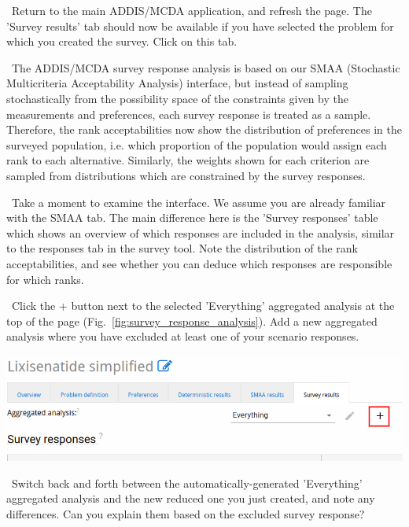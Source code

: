 \documentclass[00_mcda_tutorial.tex]{subfiles}
\begin{document}
\begin{sidebar*}
\noindent \leftpointright \, Return to the main ADDIS/MCDA application, and refresh the page. The 'Survey results' tab should now be available if you have selected the problem for which you created the survey. Click on this tab.
\newline

\noindent \faGraduationCap \, The ADDIS/MCDA survey response analysis is based on our SMAA (Stochastic Multicriteria Acceptability Analysis) interface, but instead of sampling stochastically from the possibility space of the constraints given by the measurements and preferences, each survey response is treated as a sample. Therefore, the rank acceptabilities now show the distribution of preferences in the surveyed population, i.e. which proportion of the population would assign each rank to each alternative. Similarly, the weights shown for each criterion are sampled from distributions which are constrained by the survey responses.
\newline

\noindent \leftpointright \, Take a moment to examine the interface. We assume you are already familiar with the SMAA tab. The main difference here is the 'Survey responses' table which shows an overview of which responses are included in the analysis, similar to the responses tab in the survey tool. Note the distribution of the rank acceptabilities, and see whether you can deduce which responses are responsible for which ranks.
\newline

\noindent \leftpointright \, Click the + button next to the selected 'Everything' aggregated analysis at the top of the page (Fig.~\ref{fig:survey_response_analysis}). Add a new aggregated analysis where you have excluded at least one of your scenario responses.
\newline

{	
	\centering
	\includegraphics[width=\textwidth]{fig/surveyResponseAnalysis.png}
	\label{fig:survey_response_analysis}
	\par
}

\noindent \leftpointright \, Switch back and forth between the automatically-generated 'Everything' aggregated analysis and the new reduced one you just created, and note any differences. Can you explain them based on the excluded survey response?


\end{sidebar*}
\end{document}
